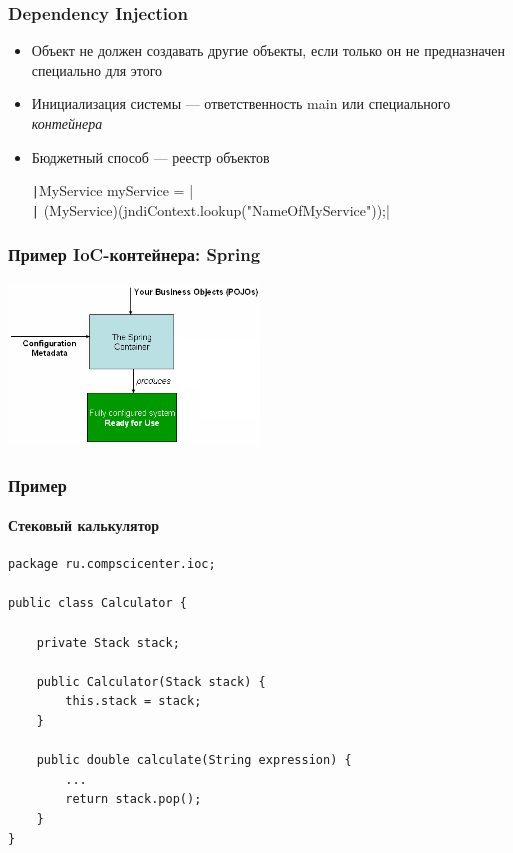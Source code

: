\documentclass{../../slides-style}
\begin{document}
    \begin{frame}
        \frametitle{Dependency Injection}
        \begin{itemize}
            \item Объект не должен создавать другие объекты, если только он не предназначен специально для этого
            \item Инициализация системы --- ответственность main или специального \textit{контейнера}
            \item Бюджетный способ --- реестр объектов

                \texttt|MyService myService = | \\
                \texttt|    (MyService)(jndiContext.lookup("NameOfMyService"));|
        \end{itemize}
    \end{frame}

    \begin{frame}
        \frametitle{Пример IoC-контейнера: Spring}
        \begin{center}
            \includegraphics[width=0.5\textwidth]{springIoC.png}
        \end{center}
    \end{frame}

    \begin{frame}[fragile]
        \frametitle{Пример}
        \framesubtitle{Стековый калькулятор}
        \begin{small}
            \begin{verbatim}
package ru.compscicenter.ioc;

public class Calculator {

    private Stack stack;

    public Calculator(Stack stack) {
        this.stack = stack;
    }

    public double calculate(String expression) {
        ...
        return stack.pop();
    }
}
            \end{verbatim}
        \end{small}
    \end{frame}
\end{document}
